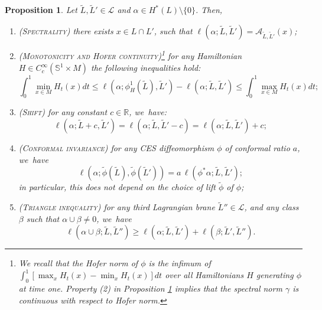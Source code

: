 \documentclass[JEP,XML,SOM,Unicode,NoFloatCountersInSection,published]{cedram}
\newtheorem{prop}[thm]{Proposition}
\theoremstyle{definition}
\newcommand {\LL}{{\mathcal L}}
\newcommand{\R}{\mathbb{R}}
\begin{document}
\begin{prop} Let $\tilde L,\tilde L'\in\LL$ and $\alpha\in H^*(L)\setminus\{0\}$. Then,
\label{prop:lag-spec-inv-properties}
\begin{enumerate}
\item \textsc{(Spectrality)} there exists $x\in L\cap L'$, such that $\ell(\alpha;\tilde L,\tilde L')=\mathcal A_{\tilde L,\tilde L'}(x)$;
\item \textsc{(Monotonicity and Hofer continuity)}\footnote{We recall that the Hofer norm of $\phi$ is the infimum of $\int_0^1 \left[\max_{x}H_t(x)-\min_{x}H_t(x)\right]dt$ over all Hamiltonians $H$ generating $\phi$ at time one. Property (2) in Proposition \ref{prop:lag-spec-inv-properties} implies that the spectral norm $\gamma$ is continuous with respect to Hofer norm.} for any Hamiltonian $H\in C^\infty_c(\mathbb{S}^1\times M)$ the following inequalities hold:
\[
\int_0^1\min_{x\in M} H_t(x) dt\leq \ell(\alpha;\phi_H^1(\tilde L),\tilde L')-\ell(\alpha;\tilde L,\tilde L')\leq \int_0^1\max_{x\in M} H_t(x) dt;
\]
\item \textsc{(Shift)} for any constant $c\in\R$, we~have:
\[
\ell(\alpha;\tilde L+c,\tilde L')=\ell(\alpha;\tilde L,\tilde L'-c)=\ell(\alpha;\tilde L,\tilde L')+c;
\]
\item \textsc{(Conformal invariance)} for any CES diffeomorphism $\phi$ of conformal ratio $a$, we~have
\[
\ell(\alpha;\tilde \phi(\tilde L),\tilde \phi(\tilde L'))=a\, \ell(\phi^*\alpha; \tilde L, \tilde L');
\]
in particular, this does not depend on the choice of lift $\tilde \phi$ of $\phi$;
\item \textsc{(Triangle inequality)} for any third Lagrangian brane $\tilde L''\in\LL$, and any class $\beta$ such that $\alpha\cup\beta\neq 0$, we~have
\[
\ell(\alpha\cup\beta;\tilde L,\tilde L'')\geq \ell(\alpha;\tilde L,\tilde L')+\ell(\beta;\tilde L',\tilde L'').
\]
\end{enumerate}
\end{prop}
\end{document}
